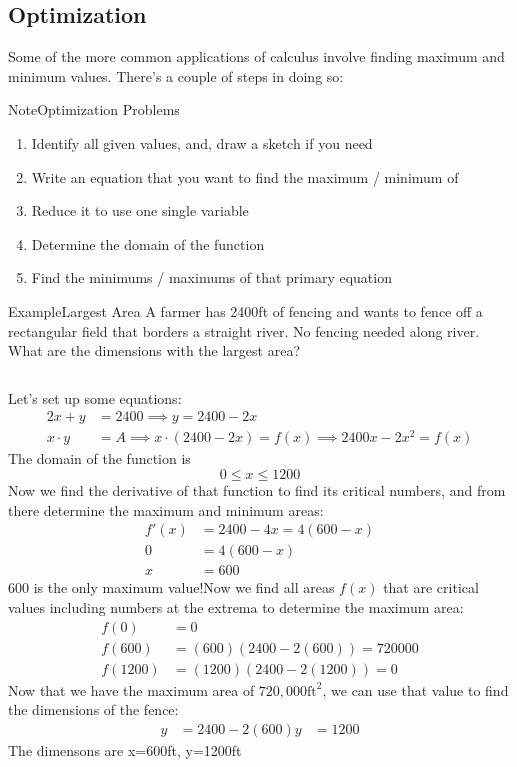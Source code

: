 \documentclass{MathNotes}
\newenvironment{example}[1]{\begin{BlueBox}{Example}{#1}}{\end{BlueBox}}
\newenvironment{note}[1]{\begin{YellowBox}{Note}{#1}}{\end{YellowBox}}
\newcommand{\bl}{
    \newline$ $\newline
}
\begin{document}
\subsection{Optimization}
Some of the more common applications of calculus involve finding maximum and
minimum values. There's a couple of steps in doing so:
\begin{note}{Optimization Problems}
\begin{enumerate}
\item Identify all given values, and, draw a sketch if you need
\item Write an equation that you want to find the maximum / minimum of
\item Reduce it to use one single variable
\item Determine the domain of the function
\item Find the minimums / maximums of that primary equation
\end{enumerate}
\end{note}
\begin{example}{Largest Area}
A farmer has 2400ft of fencing and wants to fence off a rectangular field that
borders a straight river. No fencing needed along river. What are the dimensions
with the largest area?
\bl
Let's set up some equations:
\begin{align*}
2x+y&=2400\implies y=2400-2x\\
x\cdot y&=A\implies x\cdot(2400-2x)=f(x)\implies 2400x-2x^2=f(x)
\end{align*}
The domain of the function is $$0\leq x\leq 1200$$
Now we find the derivative of that function to find its critical numbers, and
from there determine the maximum and minimum areas:
\begin{align*}
f'(x)&=2400-4x=4(600-x)\\
0&=4(600-x)\\
x&=600
\end{align*}
600 is the only maximum value!\newline Now we find all areas $f(x)$ that are
critical values including numbers at the extrema to determine the maximum area:
\begin{align*}
f(0)&=0\\
f(600)&=(600)(2400-2(600))=720000\\
f(1200)&=(1200)(2400-2(1200))=0
\end{align*}
Now that we have the maximum area of $720,000\text{ft}^2$, we can use that value to find the dimensions of the fence:
\begin{align*}
y&=2400-2(600)
y&=1200
\end{align*}
The dimensons are x=600ft, y=1200ft
\end{example}
\end{document}

